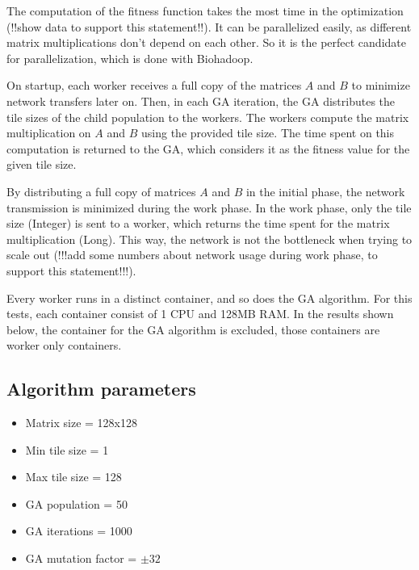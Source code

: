 \documentclass{article}
\begin{document}


The computation of the fitness function takes the most time in the optimization (!!show data to support this statement!!). It can be parallelized easily, as different matrix multiplications don't depend on each other. So it is the perfect candidate for parallelization, which is done with Biohadoop.

On startup, each worker receives a full copy of the matrices $A$ and $B$ to minimize network transfers later on. Then, in each GA iteration, the GA distributes the tile sizes of the child population to the workers. The workers compute the matrix multiplication on $A$ and $B$ using the provided tile size. The time spent on this computation is returned to the GA, which considers it as the fitness value for the given tile size.

By distributing a full copy of matrices $A$ and $B$ in the initial phase, the network transmission is minimized during the work phase. In the work phase, only the tile size (Integer) is sent to a worker, which returns the time spent for the matrix multiplication (Long). This way, the network is not the bottleneck when trying to scale out (!!!add some numbers about network usage during work phase, to support this statement!!!).

Every worker runs in a distinct container, and so does the GA algorithm. For this tests, each container consist of 1 CPU and 128MB RAM. In the results shown below, the container for the GA algorithm is excluded, those containers are worker only containers.

\subsection{Algorithm parameters}
\label{algorithm-parameters}
\begin{itemize}
  \item Matrix size = 128x128
  \item Min tile size = 1
  \item Max tile size = 128
  \item GA population = 50
  \item GA iterations = 1000
  \item GA mutation factor = $\pm 32$
\end{itemize}
\end{document}
